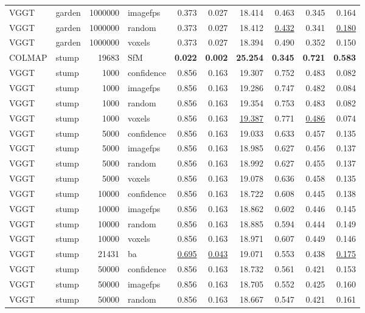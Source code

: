 \begin{table}[H]
\begin{tabular}{llrlrrrrrr}
VGGT & garden & 1000000 & imagefps & 0.373 & 0.027 & 18.414 & 0.463 & 0.345 & 0.164 \\
VGGT & garden & 1000000 & random & 0.373 & 0.027 & 18.412 & \underline{0.432} & 0.341 & \underline{0.180} \\
VGGT & garden & 1000000 & voxels & 0.373 & 0.027 & 18.394 & 0.490 & 0.352 & 0.150 \\
\midrule
COLMAP & stump & 19683 & SfM & \textbf{0.022} & \textbf{0.002} & \textbf{25.254} & \textbf{0.345} & \textbf{0.721} & \textbf{0.583} \\
VGGT & stump & 1000 & confidence & 0.856 & 0.163 & 19.307 & 0.752 & 0.483 & 0.082 \\
VGGT & stump & 1000 & imagefps & 0.856 & 0.163 & 19.286 & 0.747 & 0.482 & 0.084 \\
VGGT & stump & 1000 & random & 0.856 & 0.163 & 19.354 & 0.753 & 0.483 & 0.082 \\
VGGT & stump & 1000 & voxels & 0.856 & 0.163 & \underline{19.387} & 0.771 & \underline{0.486} & 0.074 \\
VGGT & stump & 5000 & confidence & 0.856 & 0.163 & 19.033 & 0.633 & 0.457 & 0.135 \\
VGGT & stump & 5000 & imagefps & 0.856 & 0.163 & 18.985 & 0.627 & 0.456 & 0.137 \\
VGGT & stump & 5000 & random & 0.856 & 0.163 & 18.992 & 0.627 & 0.455 & 0.137 \\
VGGT & stump & 5000 & voxels & 0.856 & 0.163 & 19.078 & 0.636 & 0.458 & 0.135 \\
VGGT & stump & 10000 & confidence & 0.856 & 0.163 & 18.722 & 0.608 & 0.445 & 0.138 \\
VGGT & stump & 10000 & imagefps & 0.856 & 0.163 & 18.862 & 0.602 & 0.446 & 0.145 \\
VGGT & stump & 10000 & random & 0.856 & 0.163 & 18.885 & 0.594 & 0.444 & 0.149 \\
VGGT & stump & 10000 & voxels & 0.856 & 0.163 & 18.971 & 0.607 & 0.449 & 0.146 \\
VGGT & stump & 21431 & ba & \underline{0.695} & \underline{0.043} & 19.071 & 0.553 & 0.438 & \underline{0.175} \\
VGGT & stump & 50000 & confidence & 0.856 & 0.163 & 18.732 & 0.561 & 0.421 & 0.153 \\
VGGT & stump & 50000 & imagefps & 0.856 & 0.163 & 18.705 & 0.552 & 0.425 & 0.160 \\
VGGT & stump & 50000 & random & 0.856 & 0.163 & 18.667 & 0.547 & 0.421 & 0.161 \\

\end{tabular}
\end{table}

